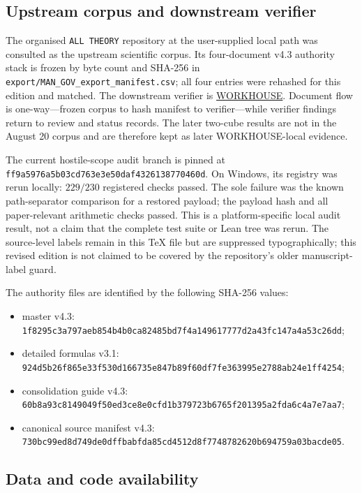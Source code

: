 \documentclass[11pt]{article}
\theoremstyle{plain}
\theoremstyle{definition}
\theoremstyle{remark}
\newcommand{\chk}[1]{}
\begin{document}
\subsection{Upstream corpus and downstream verifier}

The organised \texttt{ALL THEORY} repository at the user-supplied local path was consulted as
the upstream scientific corpus. Its four-document v4.3 authority stack is
frozen by byte count and SHA-256 in
\nolinkurl{export/MAN_GOV_export_manifest.csv}; all four entries were
rehashed for this edition and matched. The downstream verifier is
\href{https://github.com/ats314/WORKHOUSE}{WORKHOUSE}. Document flow is
one-way---frozen corpus to hash manifest to verifier---while verifier findings
return to review and status records. The later two-cube results are not in the
August 20 corpus and are therefore kept as later WORKHOUSE-local evidence.

The current hostile-scope audit branch is pinned at
\nolinkurl{ff9a5976a5b03cd763e3e50daf4326138770460d}. On Windows, its registry was
rerun locally: $229/230$ registered checks passed. The sole failure was the
known path-separator comparison for a restored payload; the payload hash and
all paper-relevant arithmetic checks passed. This is a platform-specific local
audit result, not a claim that the complete test suite or Lean tree was rerun.
The source-level \texttt{\string\chk} labels remain in this TeX file but are
suppressed typographically; this revised edition is not claimed to be covered
by the repository's older manuscript-label guard.

The authority files are identified by the following SHA-256 values:
\begin{itemize}
\item master v4.3:
  \nolinkurl{1f8295c3a797aeb854b4b0ca82485bd7f4a149617777d2a43fc147a4a53c26dd};
\item detailed formulas v3.1:
  \nolinkurl{924d5b26f865e33f530d166735e847b89f60df7fe363995e2788ab24e1ff4254};
\item consolidation guide v4.3:
  \nolinkurl{60b8a93c8149049f50ed3ce8e0cfd1b379723b6765f201395a2fda6c4a7e7aa7};
\item canonical source manifest v4.3:
  \nolinkurl{730bc99ed8d749de0dffbabfda85cd4512d8f7748782620b694759a03bacde05}.
\end{itemize}

\subsection{Data and code availability}
\end{document}
